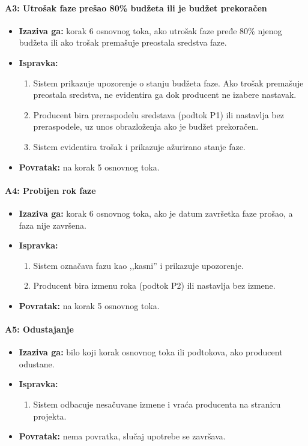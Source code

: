 \paragraph*{A3: Utrošak faze prešao 80\% budžeta ili je budžet prekoračen}
\begin{itemize}
    \item \textbf{Izaziva ga:} korak 6 osnovnog toka, ako utrošak faze pređe 80\% njenog budžeta ili ako trošak premašuje preostala sredstva faze.
    \item \textbf{Ispravka:}
    \begin{enumerate}
        \item Sistem prikazuje upozorenje o stanju budžeta faze. Ako trošak premašuje preostala sredstva, ne evidentira ga dok producent ne izabere nastavak.
        \item Producent bira preraspodelu sredstava (podtok P1) ili nastavlja bez preraspodele, uz unos obrazloženja ako je budžet prekoračen.
        \item Sistem evidentira trošak i prikazuje ažurirano stanje faze.
    \end{enumerate}
    \item \textbf{Povratak:} na korak 5 osnovnog toka.
\end{itemize}

\paragraph*{A4: Probijen rok faze}
\begin{itemize}
    \item \textbf{Izaziva ga:} korak 6 osnovnog toka, ako je datum završetka faze prošao, a faza nije završena.
    \item \textbf{Ispravka:}
    \begin{enumerate}
        \item Sistem označava fazu kao ,,kasni'' i prikazuje upozorenje.
        \item Producent bira izmenu roka (podtok P2) ili nastavlja bez izmene.
    \end{enumerate}
    \item \textbf{Povratak:} na korak 5 osnovnog toka.
\end{itemize}

\paragraph*{A5: Odustajanje}
\begin{itemize}
    \item \textbf{Izaziva ga:} bilo koji korak osnovnog toka ili podtokova, ako producent odustane.
    \item \textbf{Ispravka:}
    \begin{enumerate}
        \item Sistem odbacuje nesačuvane izmene i vraća producenta na stranicu projekta.
    \end{enumerate}
    \item \textbf{Povratak:} nema povratka, slučaj upotrebe se završava.
\end{itemize}


